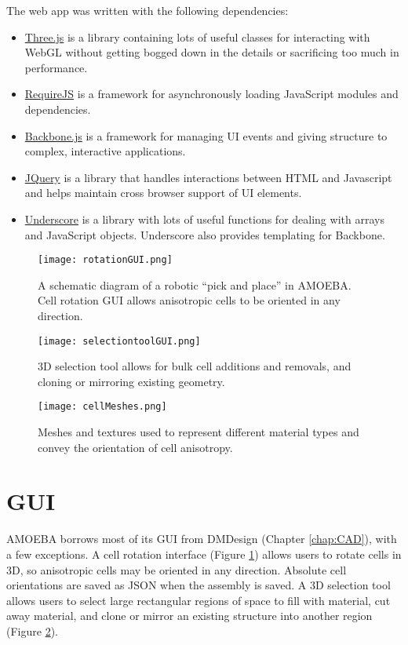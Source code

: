 {The web app was written with the following dependencies:
\begin{itemize}
\setlength\itemsep{0em}
\item \href{http://threejs.org/}{Three.js} is a library containing lots of useful classes for interacting with WebGL without getting bogged down in the details or sacrificing too much in performance.
\item \href{http://requirejs.org/}{RequireJS} is a framework for asynchronously loading JavaScript modules and dependencies.
\item \href{http://backbonejs.org/}{Backbone.js} is a framework for managing UI events and giving structure to complex, interactive applications.
\item \href{https://jquery.com/}{JQuery} is a library that handles interactions between HTML and Javascript and helps maintain cross browser support of UI elements.
\item \href{http://underscorejs.org/}{Underscore} is a library with lots of useful functions for dealing with arrays and JavaScript objects.  Underscore also provides templating for Backbone.
\end{itemize}

\begin{figure}
  \texttt{[image: rotationGUI.png]}
  \caption{A schematic diagram of a robotic ``pick and place'' in AMOEBA.  Cell rotation GUI allows anisotropic cells to be oriented in any direction.}
  \label{fig:rotationGUI}
\end{figure}

\begin{figure}
  \texttt{[image: selectiontoolGUI.png]}
  \caption{3D selection tool allows for bulk cell additions and removals, and cloning or mirroring existing geometry.}
  \label{fig:selectiontoolGUI}
\end{figure}

\begin{figure}
  \texttt{[image: cellMeshes.png]}
  \caption{Meshes and textures used to represent different material types and convey the orientation of cell anisotropy.}
  \label{fig:cellMeshes}
\end{figure}

\section{GUI}

AMOEBA borrows most of its GUI from DMDesign (Chapter \ref{chap:CAD}), with a few exceptions.  A cell rotation interface (Figure \ref{fig:rotationGUI}) allows users to rotate cells in 3D, so anisotropic cells may be oriented in any direction.  Absolute cell orientations are saved as JSON when the assembly is saved.  A 3D selection tool allows users to select large rectangular regions of space to fill with material, cut away material, and clone or mirror an existing structure into another region (Figure \ref{fig:selectiontoolGUI}).\\

}
